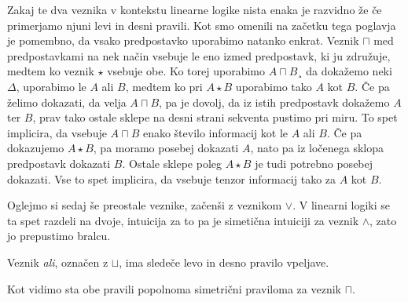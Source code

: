 Zakaj te dva veznika v kontekstu linearne logike nista enaka je razvidno že če primerjamo njuni levi in desni pravili. Kot smo omenili na začetku tega poglavja je pomembno, da vsako predpostavko uporabimo natanko enkrat. Veznik $\sqcap$ med predpostavkami na nek način vsebuje le eno izmed predpostavk, ki ju združuje, medtem ko veznik $\star$ vsebuje obe. Ko torej uporabimo $A \sqcap B$¸ da dokažemo neki $\Delta$, uporabimo le $A$ ali $B$, medtem ko pri $A \star B$ uporabimo tako $A$ kot $B$. Če pa želimo dokazati, da velja $A \sqcap B$, pa je dovolj, da iz istih predpostavk dokažemo $A$ ter $B$, prav tako ostale sklepe na desni strani sekventa pustimo pri miru. To spet implicira, da vsebuje $A\sqcap B$ enako število informacij kot le $A$ ali $B$. Če pa dokazujemo $A\star B$, pa moramo posebej dokazati $A$, nato pa iz ločenega sklopa predpostavk dokazati $B$. Ostale sklepe poleg $A\star B$ je tudi potrebno posebej dokazati. Vse to spet implicira, da vsebuje tenzor informacij tako za $A$ kot $B$.

Oglejmo si sedaj še preostale veznike, začenši z veznikom $\lor$. V linearni logiki se ta spet razdeli na dvoje, intuicija za to pa je simetična intuiciji za veznik $\land$, zato jo prepustimo bralcu.

\begin{definicija} \label{ali}
	Veznik \emph{ali}, označen z $\sqcup$, ima sledeče levo in desno pravilo vpeljave.
	\begin{center}
        \begin{bprooftree}
        \end{bprooftree}
        \begin{bprooftree}
        \end{bprooftree}
        \begin{bprooftree}
        \end{bprooftree}
    \end{center}
    Kot vidimo sta obe pravili popolnoma simetrični praviloma za veznik $\sqcap$.
\end{definicija}

